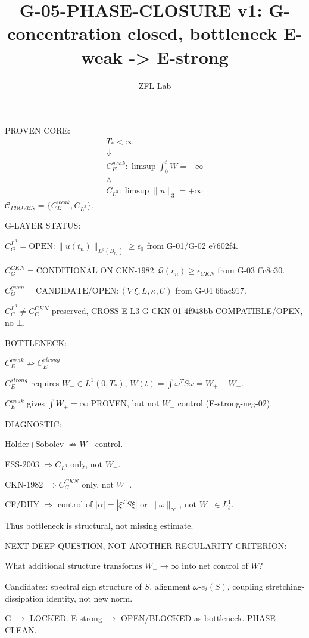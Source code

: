 \documentclass[11pt]{article}
\title{G-05-PHASE-CLOSURE v1: G-concentration closed, bottleneck E-weak -> E-strong}
\author{ZFL Lab}
\begin{document}
\maketitle


PROVEN CORE:
\begin{equation*}
\boxed{
\begin{array}{c}
T_*<\infty\\
\Downarrow\\
C_E^{weak}: \limsup\int_0^t W=+\infty\\
\land\\
C_{L^3}: \limsup\|u\|_3=+\infty
\end{array}
}
\end{equation*}
$\mathcal{C}_{PROVEN}=\{C_E^{weak},C_{L^3}\}$.

G-LAYER STATUS:

$\boxed{C_G^{L^3}=\text{OPEN}: \|u(t_n)\|_{L^3(B_{r_n})}\ge\epsilon_0}$ from G-01/G-02 e7602f4.

$\boxed{C_G^{CKN}=\text{CONDITIONAL ON CKN-1982}: \mathcal{Q}(r_n)\ge\epsilon_{CKN}}$ from G-03 ffc8c30.

$\boxed{C_G^{geom}=\text{CANDIDATE/OPEN}: (\nabla\xi,L,\kappa,U)}$ from G-04 66ac917.

$\boxed{C_G^{L^3}\neq C_G^{CKN}}$ preserved, CROSS-E-L3-G-CKN-01 4f948bb COMPATIBLE/OPEN, no $\bot$.

BOTTLENECK:

$\boxed{C_E^{weak}\not\Rightarrow C_E^{strong}}$

$C_E^{strong}$ requires $W_-\in L^1(0,T_*)$, $W(t)=\int\omega^T S\omega = W_+-W_-$.

$C_E^{weak}$ gives $\int W_+=\infty$ PROVEN, but not $W_-$ control (E-strong-neg-02).

DIAGNOSTIC:

Hölder+Sobolev $\not\Rightarrow W_-$ control.

ESS-2003 $\Rightarrow C_{L^3}$ only, not $W_-$.

CKN-1982 $\Rightarrow C_G^{CKN}$ only, not $W_-$.

CF/DHY $\Rightarrow$ control of $|\alpha|=|\xi^T S\xi|$ or $\|\omega\|_\infty$, not $W_-\in L^1_t$.

Thus bottleneck is structural, not missing estimate.

NEXT DEEP QUESTION, NOT ANOTHER REGULARITY CRITERION:

$\boxed{\text{What additional structure transforms }W_+\to\infty\text{ into net control of }W?}$

Candidates: spectral sign structure of $S$, alignment $\omega$-$e_i(S)$, coupling stretching-dissipation identity, not new norm.

G $\longrightarrow$ LOCKED. E-strong $\longrightarrow$ OPEN/BLOCKED as bottleneck. PHASE CLEAN.
\end{document}

